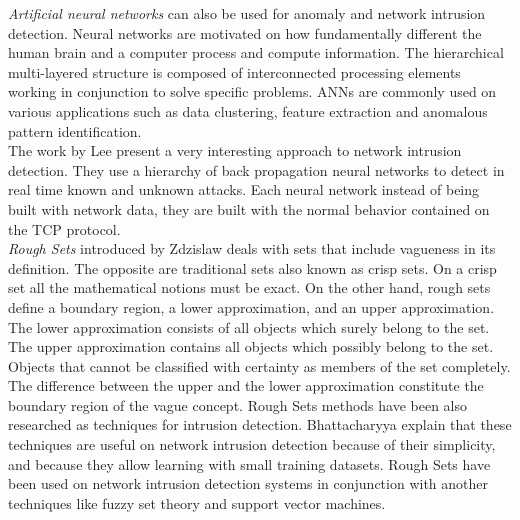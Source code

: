 \begin{itemize}
\textit{Artificial neural networks} can also be used for anomaly and network intrusion detection. Neural networks are motivated on how fundamentally different the human brain and a computer process and compute information. The hierarchical multi-layered structure is composed of interconnected processing elements working in conjunction to solve specific problems. ANNs are commonly used on various applications such as data clustering, feature extraction and anomalous pattern identification.\\
The work by Lee \etAl\cite{935046} present a very interesting approach to network intrusion detection. They use a hierarchy of back propagation neural networks to detect in real time known and unknown attacks. Each neural network instead of being built with network data, they are built with the normal behavior contained on the TCP protocol.\\

\textit{Rough Sets} introduced by Zdzislaw \cite{Pawlak199748} deals with sets that include vagueness in its definition. The opposite are traditional sets also known as crisp sets. On a crisp set all the mathematical notions must be exact. On the other hand, rough sets define a boundary region, a lower approximation, and an upper approximation. The lower approximation consists of all objects which surely belong to the set. The upper approximation contains all objects which possibly belong to the set. Objects that cannot be classified with certainty as members of the set completely. The difference between the upper and the lower approximation constitute the boundary region of the vague concept.
Rough Sets  methods have been also researched as techniques for intrusion detection. Bhattacharyya \etAl explain that these techniques are useful on network intrusion detection because of their simplicity, and because they allow learning with small training datasets\cite{Bhattacharyya:2013:NAD:2505468}. Rough Sets have been used on network intrusion detection systems in conjunction with another techniques like fuzzy set theory \cite{4509827} and support vector machines\cite{5176039}.\\



\end{itemize}
